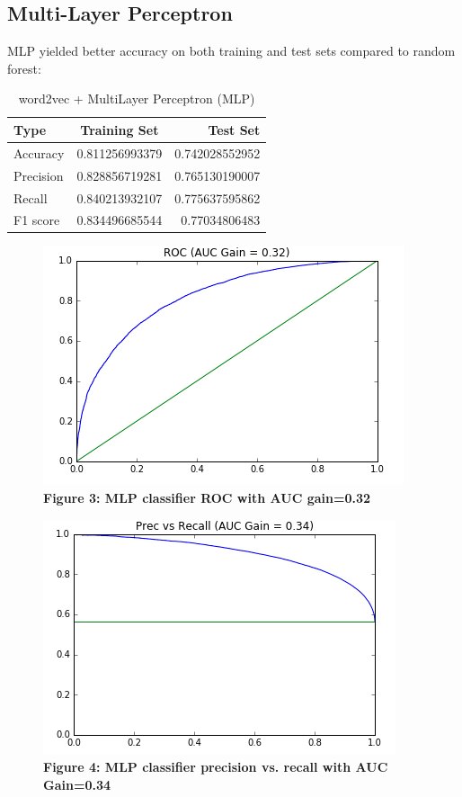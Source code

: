 \documentclass[11pt,a4paper]{article}
\begin{document}
\subsection{Multi-Layer Perceptron}
MLP yielded better accuracy on both training and test sets compared to random forest:
\begin{table}[h!]
	\begin{center}
		\caption{word2vec + MultiLayer Perceptron (MLP)}
		\label{tab:table1}
		\begin{tabular}{l|c|r} %
			\textbf{Type} & \textbf{Training Set} & \textbf{Test Set}\\
			\hline
			Accuracy & 0.811256993379 & 0.742028552952 \\
			Precision & 0.828856719281 & 0.765130190007 \\
			Recall & 0.840213932107  & 0.775637595862\\
			F1 score & 0.834496685544 & 0.77034806483
		\end{tabular}
	\end{center}
\end{table}


\begin{figure}[H]
	\centering\includegraphics[scale=0.55]{ROC_nn} 
	\caption{\textbf{Figure 3: MLP classifier ROC with AUC gain=0.32 }}
\end{figure}


\begin{figure}[H]
	\centering\includegraphics[scale=0.55]{prrc_nn} 
	\caption{\textbf{Figure 4: MLP classifier precision vs. recall with AUC Gain=0.34 }}
\end{figure}
\end{document}
